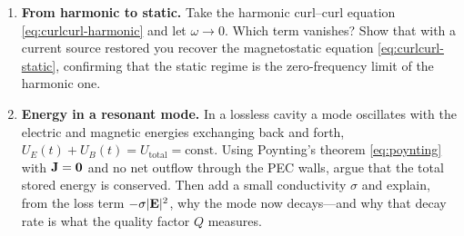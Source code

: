 \begin{enumerate}[nosep]
  \item \textbf{From harmonic to static.} Take the harmonic curl--curl equation
  \eqref{eq:curlcurl-harmonic} and let $\omega\to0$. Which term vanishes? Show
  that with a current source restored you recover the magnetostatic equation
  \eqref{eq:curlcurl-static}, confirming that the static regime is the
  zero-frequency limit of the harmonic one.

  \item \textbf{Energy in a resonant mode.} In a lossless cavity a mode
  oscillates with the electric and magnetic energies exchanging back and forth,
  $U_E(t)+U_B(t)=U_{\text{total}}=\text{const}$. Using Poynting's theorem
  \eqref{eq:poynting} with $\mathbf{J}=\bm0$ and no net outflow through the PEC walls,
  argue that the total stored energy is conserved. Then add a small
  conductivity $\sigma$ and explain, from the loss term $-\sigma\lvert\mathbf{E}\rvert^2$,
  why the mode now decays---and why that decay rate is what the quality factor
  $Q$ measures.
\end{enumerate}
